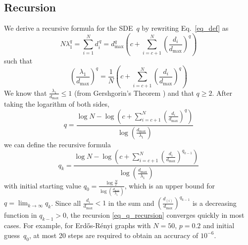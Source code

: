 \documentclass{comnet}%
\newcommand{\ER}{Erd\H{o}s-R\'{e}nyi}
\begin{document}
\subsection{Recursion}
We derive a recursive formula for the SDE~$q$ by rewriting Eq.~\eqref{eq_def} as
\[
N\lambda_{1}^{q}=\sum_{i=1}^{N}d_{i}^{\,q}=d_{\max}^{q}\left(  c+\sum
_{i=c+1}^{N}\left(  \frac{d_i}{d_{\max}}\right)
^{q}\right)
\]
such that
\begin{equation}\label{rewriting_def_SDE}
	\left( \frac{\lambda_{1}}{d_{\max}}\right)^{q} = \frac{1}{N}\left(c + \sum_{i=c+1}^{N}\left( \frac{d_i}{d_{\max}}\right)^{q}\right)
\end{equation}
We know that $\frac{\lambda_{1}}{d_{\max}}\leq1$ (from Gershgorin's
Theorem \cite[art.\ 245]{GS2}) and that $q\geq2$.
After taking the logarithm of both sides,%
\begin{equation}\label{q_log_transform}
	q = \frac{\log N-\log\left(  c + \sum_{i=c+1}^{N}\left(  \frac{d_i}{d_{\max}}\right)^{q}\right)  }{\log\left( \frac{d_{\max}}{\lambda_{1}}\right)}
\end{equation}
we can define the recursive formula
\begin{equation}\label{eq_q_recursion}
	q_k = \frac{\log N-\log\left(  c + \sum_{i=c+1}^{N}\left(  \frac
		{d_i}{d_{\max}}\right)^{q_{k-1}}\right)  }{\log\left(
		\frac{d_{\max}}{\lambda_{1}}\right)  }
\end{equation}
with initial starting value $q_{0}=\frac{\log \frac{N}{c}}{\log\left( \frac{d_{\max}}{\lambda_{1}}\right) }$, which is an upper bound for $q=\lim_{k\rightarrow\infty}q_{k}$. Since all $\frac{d_i}{d_{\max}}<1$ in the sum and $\left(  \frac{d_{\left(  i\right)  }}{d_{\max
}}\right)  ^{q_{k-1}}$ is a decreasing function in $q_{k-1}>0$, the recursion \eqref{eq_q_recursion} converges quickly in most cases. For example, for \ER{} graphs with $N=50$, $p=0.2$ and initial guess~$q_0$, at most 20 steps are required to obtain an accuracy of $10^{-6}$.
\end{document}
